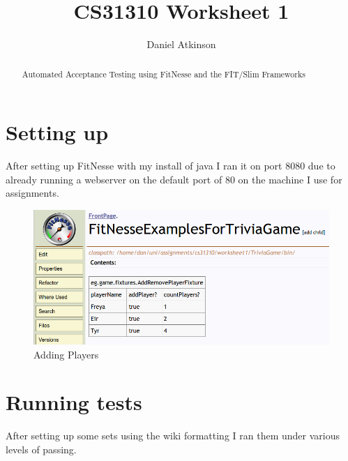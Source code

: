 \documentclass{article}
\begin{document}
\title{CS31310 Worksheet 1}

\author{Daniel Atkinson}

\maketitle

\begin{abstract}

Automated Acceptance Testing using FitNesse and the FIT/Slim Frameworks

\end{abstract}


\section{Setting up}
After setting up FitNesse with my install of java I ran it on port 8080 due to already running a webserver on the default port of 80 on the machine I use for assignments.
\begin{figure}[h]
\centering
	\includegraphics[width=5.0in] {figures/Screenshot1.png}
	\caption{Adding Players}
	\label{Adding players}
\end{figure}


\section{Running tests}
After setting up some sets using the wiki formatting I ran them under various levels of passing.
\end{document}
